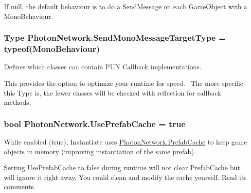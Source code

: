 If null, the default behaviour is to do a Send\+Message on each Game\+Object with a Mono\+Behaviour. 
\subsubsection[{\texorpdfstring{Send\+Mono\+Message\+Target\+Type}{SendMonoMessageTargetType}}]{\setlength{\rightskip}{0pt plus 5cm}Type Photon\+Network.\+Send\+Mono\+Message\+Target\+Type = typeof(Mono\+Behaviour)\hspace{0.3cm}{\ttfamily [static]}}\hypertarget{class_photon_network_a598db34bb93cdb17a3032a96c64b0ce3}{}\label{class_photon_network_a598db34bb93cdb17a3032a96c64b0ce3}


Defines which classes can contain P\+UN Callback implementations. 

This provides the option to optimize your runtime for speed.~\newline
 The more specific this Type is, the fewer classes will be checked with reflection for callback methods. 
\subsubsection[{\texorpdfstring{Use\+Prefab\+Cache}{UsePrefabCache}}]{\setlength{\rightskip}{0pt plus 5cm}bool Photon\+Network.\+Use\+Prefab\+Cache = true\hspace{0.3cm}{\ttfamily [static]}}\hypertarget{class_photon_network_a232458dc1894d99134f6d978524cbb99}{}\label{class_photon_network_a232458dc1894d99134f6d978524cbb99}


While enabled (true), Instantiate uses \hyperlink{class_photon_network_a5d231578fbaadcb89dd592d2d8ddfd0a}{Photon\+Network.\+Prefab\+Cache} to keep game objects in memory (improving instantiation of the same prefab). 

Setting Use\+Prefab\+Cache to false during runtime will not clear Prefab\+Cache but will ignore it right away. You could clean and modify the cache yourself. Read its comments. 
